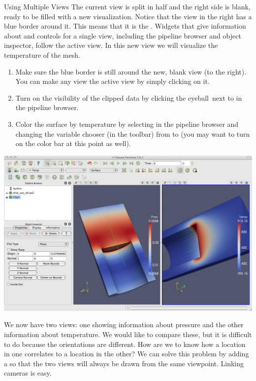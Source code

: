 \begin{exercise}{Using Multiple Views}
  The current view is split in half and the right side is blank, ready to
  be filled with a new visualization.  Notice that the view in the right
  has a blue border around it.  This means that it is the .  Widgets that give information about and controls for a single
  view, including the pipeline browser and object inspector, follow the
  active view.  In this new view we will visualize the temperature of the
  mesh.

  \begin{enumerate}
  \item Make sure the blue border is still around the new, blank view (to
    the right).  You can make any view the active view by simply clicking
    on it.
  \item Turn on the visibility of the clipped data by clicking the
    eyeball~\eyeballg next to  in the pipeline browser.
  \item Color the surface by temperature by selecting  in the
    pipeline browser and changing the variable chooser (in the toolbar)
    from  to  (you may want to turn on the color
    bar at this point as well).
    \savecounter
  \end{enumerate}

  \begin{inlinefig}
    \includegraphics[width=\scw]{images/SplitView2}
  \end{inlinefig}

  We now have two views: one showing information about pressure and the
  other information about temperature.  We would like to compare these, but
  it is difficult to do because the orientations are different.  How are we
  to know how a location in one correlates to a location in the other?  We
  can solve this problem by adding a  so that the two
  views will always be drawn from the same viewpoint.  Linking cameras is
  easy.


\end{exercise}
